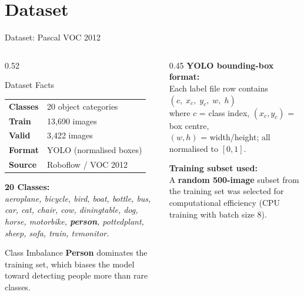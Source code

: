 \documentclass[aspectratio=169, 10pt]{beamer}
\begin{document}
\section{Dataset}

\begin{frame}{Dataset: Pascal VOC 2012}
\begin{columns}[T]
\begin{column}{0.52\textwidth}
  \begin{block}{Dataset Facts}
    \begin{tabular}{ll}
      \textbf{Classes} & 20 object categories \\[3pt]
      \textbf{Train}   & 13{,}690 images       \\[3pt]
      \textbf{Valid}   & 3{,}422 images         \\[3pt]
      \textbf{Format}  & YOLO (normalised boxes)\\[3pt]
      \textbf{Source}  & Roboflow / VOC 2012   \\
    \end{tabular}
  \end{block}

  \textbf{20 Classes:}\\[2pt]
  {\small\textit{aeroplane, bicycle, bird, boat, bottle, bus, car, cat,
  chair, cow, diningtable, dog, horse, motorbike, \textbf{person},
  pottedplant, sheep, sofa, train, tvmonitor.}}

  \begin{alertblock}{Class Imbalance}
    \textbf{Person} dominates the training set, which biases the model
    toward detecting people more than rare classes.
  \end{alertblock}
\end{column}
\begin{column}{0.45\textwidth}
  \textbf{YOLO bounding-box format:}\\[3pt]
  Each label file row contains\\
  $(c,\; x_c,\; y_c,\; w,\; h)$\\[2pt]
  where $c$ = class index, $(x_c,y_c)$ = box centre,\\
  $(w,h)$ = width/height; all normalised to $[0,1]$.

  \vspace{0.2cm}
  \textbf{Training subset used:}\\
  A \textbf{random 500-image} subset from the training set was selected
  for computational efficiency (CPU training with batch size 8).
\end{column}
\end{columns}
\end{frame}
\end{document}
